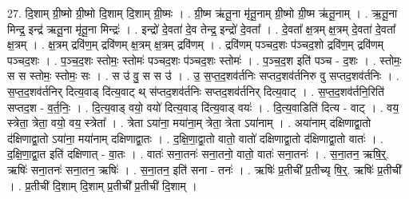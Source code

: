 \documentclass[17pt]{extarticle}
\begin{document}
27. दि॒शाम् ग्री॒ष्मो ग्री॒ष्मो दि॒शाम् दि॒शाम् ग्री॒ष्मः । . ग्री॒ष्म ऋ॑तू॒ना मृ॑तू॒नाम् ग्री॒ष्मो ग्री॒ष्म ऋ॑तू॒नाम् । . ऋ॒तू॒ना मिन्द्र॒ इन्द्र॑ ऋतू॒ना मृ॑तू॒ना मिन्द्रः॑ । . इन्द्रो॑ दे॒वता॑ दे॒व तेन्द्र॒ इन्द्रो॑ दे॒वता᳚ । . दे॒वता᳚ क्ष॒त्रम् क्ष॒त्रम् दे॒वता॑ दे॒वता᳚ क्ष॒त्रम् । . क्ष॒त्रम् द्रवि॑ण॒म् द्रवि॑णम् क्ष॒त्रम् क्ष॒त्रम् द्रवि॑णम् । . द्रवि॑णम् पञ्चद॒शः प॑ञ्चद॒शो द्रवि॑ण॒म् द्रवि॑णम् पञ्चद॒शः । . प॒ञ्च॒द॒शः स्तोमः॒ स्तोमः॑ पञ्चद॒शः प॑ञ्चद॒शः स्तोमः॑ । . प॒ञ्च॒द॒श इति॑ पञ्च - द॒शः । . स्तोमः॒ स स स्तोमः॒ स्तोमः॒ सः । . स उ॑ वु॒ स स उ॑ । . उ॒ स॒प्त॒द॒शव॑र्तनिः सप्तद॒शव॑र्तनिरु  वु सप्तद॒शव॑र्तनिः । . स॒प्त॒द॒शव॑र्तनिर् दित्य॒वाड् दि॑त्य॒वाट् थ् स॑प्तद॒शव॑र्तनिः सप्तद॒शव॑र्तनिर् दित्य॒वाट् । . स॒प्त॒द॒शव॑र्तनि॒रिति॑ सप्तद॒श - व॒र्त॒निः॒ । . दि॒त्य॒वाड् वयो॒ वयो॑ दित्य॒वाड् दि॑त्य॒वाड् वयः॑ । . दि॒त्य॒वाडिति॑ दित्य - वाट् । . वय॒ स्त्रेता॒ त्रेता॒ वयो॒ वय॒ स्त्रेता᳚ । . त्रेता ऽया॑ना॒ मया॑ना॒म् त्रेता॒ त्रेता ऽया॑नाम् । . अया॑नाम् दक्षिणाद्वा॒तो द॑क्षिणाद्वा॒तो ऽया॑ना॒ मया॑नाम् दक्षिणाद्वा॒तः । . द॒क्षि॒णा॒द्वा॒तो वातो॒ वातो॑ दक्षिणाद्वा॒तो द॑क्षिणाद्वा॒तो वातः॑ । . द॒क्षि॒णा॒द्वा॒त इति॑ दक्षिणात् - वा॒तः । . वातः॑ सना॒तनः॑ सना॒तनो॒ वातो॒ वातः॑ सना॒तनः॑ । . स॒ना॒तन॒ ऋषि॒र्॒. ऋषिः॑ सना॒तनः॑ सना॒तन॒ ऋषिः॑ । . स॒ना॒तन॒ इति॑ सना - तनः॑ । . ऋषिः॑ प्र॒तीची᳚ प्र॒तीच्यृ षि॒र्॒. ऋषिः॑ प्र॒तीची᳚ । . प्र॒तीची॑ दि॒शाम् दि॒शाम् प्र॒तीची᳚ प्र॒तीची॑ दि॒शाम् । \newline
\end{document}
